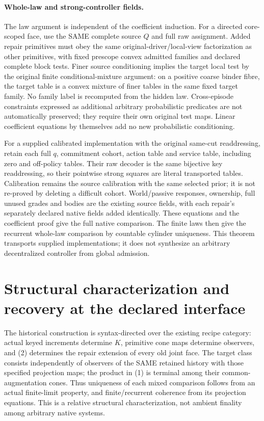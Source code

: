 \documentclass{article}
\begin{document}
\paragraph{Whole-law and strong-controller fields.}
The law argument is independent of the coefficient induction. For a directed core-scoped face, use the SAME complete source $Q$ and full raw assignment. Added repair primitives must obey the same original-driver/local-view factorization as other primitives, with fixed prescope convex admitted families and declared complete block tests. Finer source conditioning implies the target local test by the original finite conditional-mixture argument: on a positive coarse binder fibre, the target table is a convex mixture of finer tables in the same fixed target family. No family label is recomputed from the hidden law. Cross-episode constraints expressed as additional arbitrary probabilistic predicates are not automatically preserved; they require their own original test maps. Linear coefficient equations by themselves add no new probabilistic conditioning.

For a supplied calibrated implementation with the original same-cut readdressing, retain each full $q$, commitment cohort, action table and service table, including zero and off-policy tables. Their raw decoder is the same bijective key readdressing, so their pointwise strong squares are literal transported tables. Calibration remains the source calibration with the same selected prior; it is not re-proved by deleting a difficult cohort. World/passive responses, ownership, full unused grades and bodies are the existing source fields, with each repair's separately declared native fields added identically. These equations and the coefficient proof give the full native comparison. The finite laws then give the recurrent whole-law comparison by countable cylinder uniqueness. This theorem transports supplied implementations; it does not synthesize an arbitrary decentralized controller from global admission.

\section{Structural characterization and recovery at the declared interface}
The historical construction is syntax-directed over the existing recipe category: actual keyed increments determine $K$, primitive cone maps determine observers, and (2) determines the repair extension of every old joint face. The target class consists independently of observers of the SAME retained history with those specified projection maps; the product in (1) is terminal among their common-augmentation cones. Thus uniqueness of each mixed comparison follows from an actual finite-limit property, and finite/recurrent coherence from its projection equations. This is a relative structural characterization, not ambient finality among arbitrary native systems.
\end{document}
